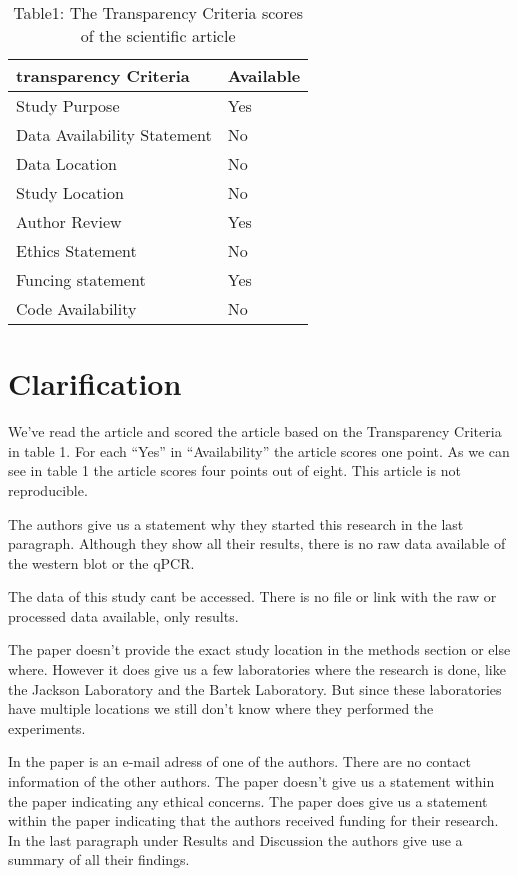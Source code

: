 \documentclass[
]{book}
\begin{document}
\begin{table}

\caption{\label{tab:unnamed-chunk-8}Table1: The Transparency Criteria scores of the scientific article}
\centering
\begin{tabular}[t]{l|l}
\hline
transparency Criteria & Available\\
\hline
Study Purpose & Yes\\
\hline
Data Availability Statement & No\\
\hline
Data Location & No\\
\hline
Study Location & No\\
\hline
Author Review & Yes\\
\hline
Ethics Statement & No\\
\hline
Funcing statement & Yes\\
\hline
Code Availability & No\\
\hline
\end{tabular}
\end{table}

\hypertarget{clarification}{%
\section{Clarification}\label{clarification}}

We've read the article and scored the article based on the Transparency Criteria in table 1. For each ``Yes'' in ``Availability'' the article scores one point. As we can see in table 1 the article scores four points out of eight. This article is not reproducible.

The authors give us a statement why they started this research in the last paragraph.
Although they show all their results, there is no raw data available of the western blot or the qPCR.

The data of this study cant be accessed. There is no file or link with the raw or processed data available, only results.

The paper doesn't provide the exact study location in the methods section or else where. However it does give us a few laboratories where the research is done, like the Jackson Laboratory and the Bartek Laboratory. But since these laboratories have multiple locations we still don't know where they performed the experiments.

In the paper is an e-mail adress of one of the authors. There are no contact information of the other authors.
The paper doesn't give us a statement within the paper indicating any ethical concerns.
The paper does give us a statement within the paper indicating that the authors received funding for their research. In the last paragraph under Results and Discussion the authors give use a summary of all their findings.
\end{document}

